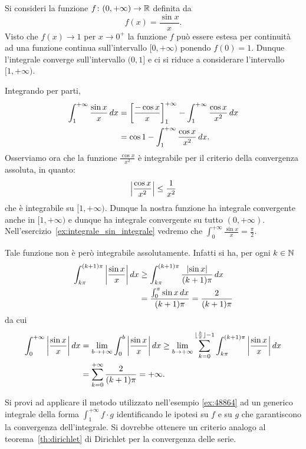 \begin{example}
\label{ex:48864}%
\mymark{*}%
Si consideri la funzione $f\colon (0,+\infty) \to {\mathbb R}$
definita da
\[
  f(x) = \frac{\sin x }{x}.
\]
Visto che $f(x)\to 1$ per $x\to 0^+$ la funzione $f$
può essere estesa per continuità ad una funzione continua sull'intervallo
$[0,+\infty)$ ponendo $f(0)=1$.
Dunque l'integrale converge sull'intervallo $(0,1]$ e ci si
riduce a considerare l'intervallo $[1,+\infty)$.

Integrando per parti,
\begin{align*}
  \int_1^{+\infty} \frac{\sin x}{x}\, dx
  &= {\left[ \frac{-\cos x}{x} \right]}_1^{+\infty} -
  \int_1^{+\infty} \frac{\cos x}{x^2} \, dx \\
  &= \cos 1 - \int_1^{+\infty} \frac{\cos x}{x^2}\, dx.
\end{align*}
Osserviamo ora che la funzione $\frac{\cos x}{x^2}$ è integrabile
per il criterio della convergenza assoluta, in quanto:
\[
  {\left|\frac{\cos x}{x^2}\right|} \le \frac{1}{x^2}
\]
che è integrabile su $[1,+\infty)$.
Dunque la nostra funzione ha integrale convergente anche in $[1,+\infty)$
e dunque ha integrale convergente su tutto $(0,+\infty)$.
Nell'esercizio~\ref{ex:integrale_sin_integrale} vedremo che
$\int_0^{+\infty} \frac{\sin x}{x} = \frac \pi 2$.

Tale funzione non è però integrabile assolutamente.
Infatti si ha,
per ogni $k\in {\mathbb N}$
\begin{align*}
  \int_{k\pi}^{(k+1)\pi} {\left|\frac{\sin x} x\right|}\, dx
  &\ge \int_{k\pi}^{(k+1)\pi} \frac{{\left|\sin x\right|}}{(k+1)\pi}\, dx\\
  &= \frac{\int_0^\pi \sin x \, dx}{(k+1)\pi}
  = \frac{2}{(k+1)\pi}
\end{align*}
da cui
\begin{align*}
  \int_0^{+\infty} {\left|\frac{\sin x}{x}\right|}\, dx
  & = \lim_{b\to +\infty} \int_0^b {\left|\frac{\sin x}{x}\right|}\, dx 
  \ge \lim_{b\to+\infty} \sum_{k=0}^{\lfloor \frac{b}{\pi}\rfloor-1} \int_{k\pi}^{(k+1)\pi}{\left|\frac{\sin x} x\right|}\, dx\\
  &= \sum_{k=0}^{+\infty} \frac{2}{(k+1)\pi} = +\infty.
\end{align*}
\end{example}

\begin{exercise}
  Si provi ad applicare il metodo utilizzato nell'esempio \ref{ex:48864} ad 
  un generico integrale della forma $\int_1^{+\infty} f\cdot g$ identificando le ipotesi 
  su $f$ e su $g$ che garantiscono la convergenza dell'integrale.
  Si dovrebbe ottenere un criterio analogo al teorema~\ref{th:dirichlet} di Dirichlet
  per la convergenza delle serie.
\end{exercise}


